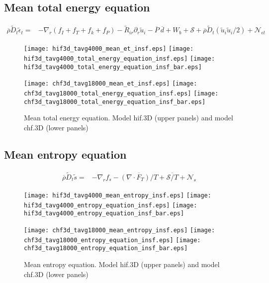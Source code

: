 \documentclass[10pt,paper=a4]{report}
\newcommand{\fht}{\widetilde}
\newcommand{\fav}{\widetilde}
\newcommand{\av}{\overline}
\begin{document}
\newpage

\subsection{Mean total energy equation}

\begin{align}
\av{\rho} \fav{D}_t \fav{\epsilon}_t = &  - \nabla_r ( f_I + f_T + f_k + f_P ) - \fht{R}_{ir}\partial_r \fht{u}_i - \av{P} \ \av{d} + W_b + {\mathcal S} + \av{\rho}\fav{D}_t (\fav{u}_i \fav{u}_i / 2) + {\mathcal N_{\epsilon t}} 
\end{align}

\begin{figure}[!h]
\centerline{
\texttt{[image: hif3d\_tavg4000\_mean\_et\_insf.eps]}
\texttt{[image: hif3d\_tavg4000\_total\_energy\_equation\_insf.eps]}
\texttt{[image: hif3d\_tavg4000\_total\_energy\_equation\_insf\_bar.eps]}}

\centerline{
\texttt{[image: chf3d\_tavg18000\_mean\_et\_insf.eps]}
\texttt{[image: chf3d\_tavg18000\_total\_energy\_equation\_insf.eps]}
\texttt{[image: chf3d\_tavg18000\_total\_energy\_equation\_insf\_bar.eps]}}

\caption{Mean total energy equation. Model {\sf hif.3D} (upper panels) and model {\sf chf.3D} (lower panels)}
\end{figure}


\newpage

\subsection{Mean entropy equation}

\begin{align}
\av{\rho} \fav{D}_t \fav{s} = & - \nabla_r  f_s    - \av{(\nabla \cdot F_T)/T}+ \av{{\mathcal S}/T} + {\mathcal N_s}   
\end{align}

\begin{figure}[!h]
\centerline{
\texttt{[image: hif3d\_tavg4000\_mean\_entropy\_insf.eps]}
\texttt{[image: hif3d\_tavg4000\_entropy\_equation\_insf.eps]}
\texttt{[image: hif3d\_tavg4000\_entropy\_equation\_insf\_bar.eps]}}

\centerline{
\texttt{[image: chf3d\_tavg18000\_mean\_entropy\_insf.eps]}
\texttt{[image: chf3d\_tavg18000\_entropy\_equation\_insf.eps]}
\texttt{[image: chf3d\_tavg18000\_entropy\_equation\_insf\_bar.eps]}}

\caption{Mean entropy equation. Model {\sf hif.3D} (upper panels) and model {\sf chf.3D} (lower panels)}
\end{figure}
\end{document}
